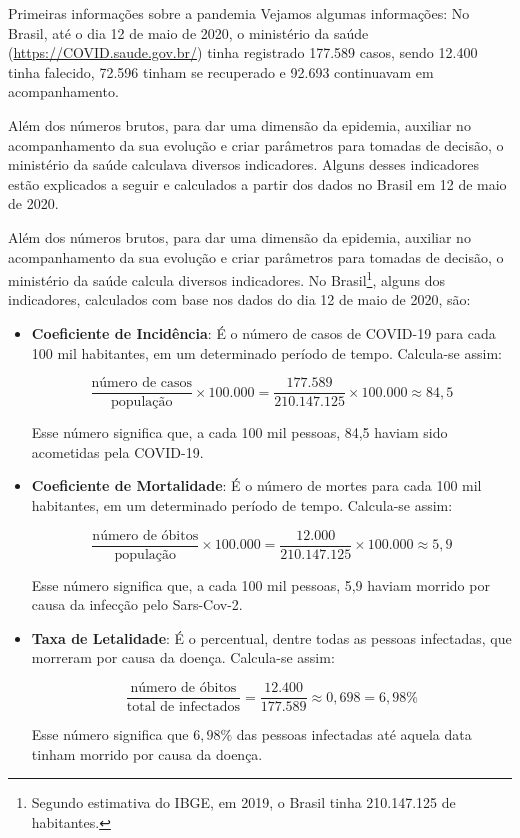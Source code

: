 \begin{example}{Primeiras informações sobre a pandemia}
Vejamos algumas informações: No Brasil, até o dia 12 de maio de 2020, o ministério da saúde (\url{https://COVID.saude.gov.br/}) tinha registrado 177.589 casos, sendo 12.400 tinha falecido, 72.596 tinham se recuperado e 92.693 continuavam em acompanhamento.

Além dos números brutos, para dar uma dimensão da epidemia, auxiliar no acompanhamento da sua evolução e criar parâmetros para tomadas de decisão, o ministério da saúde calculava diversos indicadores. Alguns desses indicadores estão explicados a seguir e calculados a partir dos dados no Brasil em 12 de maio de 2020.

Além dos números brutos, para dar uma dimensão da epidemia, auxiliar no acompanhamento da sua evolução e criar parâmetros para tomadas de decisão, o ministério da saúde calcula diversos indicadores. No Brasil\footnote{Segundo estimativa do IBGE, em 2019, o Brasil tinha 210.147.125 de habitantes.}, alguns dos indicadores, calculados com base nos dados do dia 12 de maio de 2020, são:

\begin{itemize}
\item \textbf{Coeficiente de Incidência}: É o número de casos de COVID-19 para cada 100 mil habitantes, em um determinado período de tempo. Calcula-se assim:

\begin{equation*}
\frac{\text{número de casos}}{\text{população}} \times {100.000} = \frac{{177.589}}{{210.147.125}} \times {100.000} \approx 84{,}5
\end{equation*}

Esse número significa que, a cada 100 mil pessoas, 84,5 haviam sido acometidas pela COVID-19.

\item \textbf{Coeficiente de Mortalidade}: É o número de mortes para cada 100 mil habitantes, em um determinado período de tempo. Calcula-se assim:

\begin{equation*}
\frac{\text{número de óbitos}}{\text{população}} \times {100.000} = \frac{{12.000}}{{210.147.125}}\times{100.000}\approx 5,9
\end{equation*}

Esse número significa que, a cada 100 mil pessoas, 5,9 haviam morrido por causa da infecção pelo Sars-Cov-2.

\item \textbf{Taxa de Letalidade}: É o percentual, dentre todas as pessoas infectadas, que morreram por causa da doença. Calcula-se assim:

\begin{equation*}
\frac{\text{número de óbitos}}{\text{total de infectados}} = \frac{{12.400}}{{177.589}} \approx 0,698 = 6,98\%
\end{equation*}

Esse número significa que $6{,}98\%$ das pessoas infectadas até aquela data tinham morrido por causa da doença.

\end{itemize}
\end{example}


